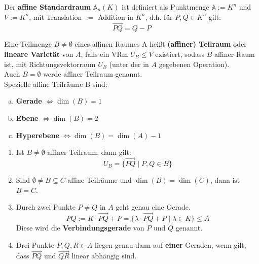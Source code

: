 \documentclass[parskip,a4paper,twoside,DIV15,BCOR12mm]{scrbook}
\begin{document}
\begin{example}
Der \textbf{affine Standardraum} $\mathbb{A}_n(K)$ ist definiert als  Punktmenge
$\mathbb{A}:=K^n$ und $V:=K^n$, mit Translation $:=$ Addition in $K^n$, d.h.
für $P,Q\in K^n$ gilt:
\[\overrightarrow{PQ}=Q-P\]
\end{example}

\begin{definition}
Eine Teilmenge $B \ne \emptyset$ eines affinen Raumes A heißt \textbf{(affiner) Teilraum}
oder \textbf{lineare Varietät} von $A$, falls ein VRm $U_B \le V$ existiert, sodass
$B$ affiner Raum ist, mit Richtungsvektorraum $U_B$ (unter der in $A$ gegebenen
Operation).\\
Auch $B = \emptyset$ werde affiner Teilraum genannt.\\
Spezielle affine Teilräume B sind:
\begin{enumerate}[(a)]
\item \textbf{Gerade} $\iff \dim(B) = 1$
\item \textbf{Ebene} $\iff \dim(B) = 2$
\item \textbf{Hyperebene} $\iff \dim(B) = \dim(A)-1$
\end{enumerate}
\end{definition}

\begin{lemma}
\begin{enumerate}
\item Ist $B\ne \emptyset$ affiner Teilraum, dann gilt:
\[U_B=\{\overrightarrow{PQ}\mid P,Q\in B\}\]
\item Sind $\emptyset\ne B \subseteq C$ affine Teilräume und $\dim(B)=\dim(C)$, dann ist $B=C$.
\item Durch zwei Punkte $P\ne Q$ in $A$ geht genau eine Gerade.
\[PQ := K \cdot \overrightarrow{PQ}+P = \{\lambda \cdot \overrightarrow{PQ}+P\mid\lambda\in K\}\le A\]
Diese wird die \textbf{Verbindungsgerade} von $P$ und $Q$ genannt.
\item Drei Punkte $P,Q,R \in A$ liegen genau dann auf \textbf{einer} Geraden, wenn gilt,
dass $\overrightarrow{PQ}$ und $\overrightarrow{QR}$ linear abhängig sind.
\end{enumerate}
\end{lemma}
\end{document}
